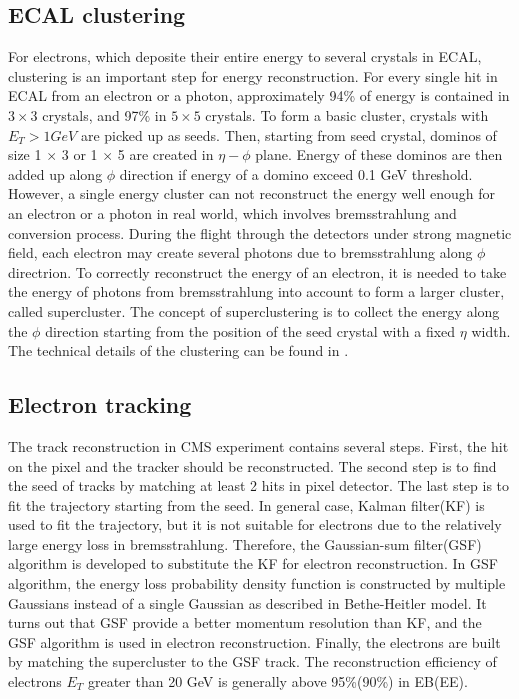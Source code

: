 \subsection*{ECAL clustering}
For electrons, which deposite their entire energy to several crystals in ECAL, clustering is an important step for energy reconstruction. For every single hit in ECAL from an electron or a photon, approximately 94\% of energy is contained in $3\times3$ crystals, and 97\% in $5\times5$ crystals. To form a basic cluster, crystals with $E_{T} > 1 GeV$ are picked up as seeds. Then, starting from seed crystal, dominos of size 1 $\times$ 3 or  1 $\times$ 5 are created in $\eta -\phi$ plane. Energy of these dominos are then added up along $\phi$ direction if energy of a domino exceed 0.1 GeV threshold.     
  However, a single energy cluster can not reconstruct the energy well enough for an electron or a photon in real world, which involves bremsstrahlung and conversion process.\newline
During the flight through the detectors under strong magnetic field, each electron may create several photons due to bremsstrahlung along $\phi$ directrion. To correctly reconstruct the energy of an electron, it is needed to take the energy of photons from bremsstrahlung into account to form a larger cluster, called supercluster. The concept of superclustering is to collect the energy along the $\phi$ direction starting from the position of the seed crystal with a fixed $\eta$ width. The technical details of the clustering can be found in \cite{ptdr1}.
\subsection*{Electron tracking}
The track reconstruction in CMS experiment contains several steps. First, the hit on the pixel and the tracker should be reconstructed. The second step is to find the seed of tracks by matching at least 2 hits in pixel detector. The last step is to fit the trajectory starting from the seed\cite{GSF,ptdr1}. In general case, Kalman filter(KF) is used to fit the trajectory\cite{trkreco}, but it is not suitable for electrons due to the relatively large energy loss in bremsstrahlung. Therefore, the Gaussian-sum filter(GSF) algorithm is developed to substitute the KF for electron reconstruction\cite{GSF}. In GSF algorithm, the energy loss probability density function is constructed by multiple Gaussians instead of a single Gaussian as described in Bethe-Heitler model\cite{BHmodel}. It turns out that GSF provide a better momentum resolution than KF, and the GSF algorithm is used in electron reconstruction\cite{GSF}. Finally, the electrons are built by matching the supercluster to the GSF track. The reconstruction efficiency of electrons $E_{T}$ greater than 20 GeV is generally above 95\%(90\%) in EB(EE)\cite{eRecoEff}.

